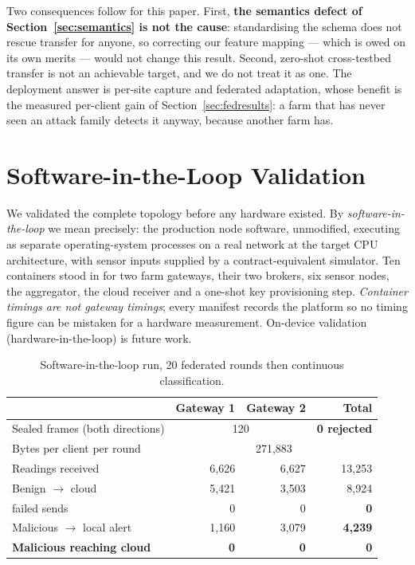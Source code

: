 \documentclass[conference]{IEEEtran}
\begin{document}
Two consequences follow for this paper. First, \textbf{the semantics defect of
Section~\ref{sec:semantics} is not the cause}: standardising the schema does not rescue transfer
for anyone, so correcting our feature mapping --- which is owed on its own merits --- would not
change this result. Second, zero-shot cross-testbed transfer is not an achievable target, and we
do not treat it as one. The deployment answer is per-site capture and federated adaptation, whose
benefit is the measured per-client gain of Section~\ref{sec:fedresults}: a farm that has never
seen an attack family detects it anyway, because another farm has.

\section{Software-in-the-Loop Validation}\label{sec:sil}
We validated the complete topology before any hardware existed. By
\emph{software-in-the-loop} we mean precisely: the production node software, unmodified,
executing as separate operating-system processes on a real network at the target CPU
architecture, with sensor inputs supplied by a contract-equivalent simulator. Ten containers
stood in for two farm gateways, their two brokers, six sensor nodes, the aggregator, the cloud
receiver and a one-shot key provisioning step. \emph{Container timings are not gateway timings};
every manifest records the platform so no timing figure can be mistaken for a hardware
measurement. On-device validation (hardware-in-the-loop) is future work.

\begin{table}[tbp]
\caption{Software-in-the-loop run, 20 federated rounds then continuous classification.}
\label{tab:sil}
\centering\footnotesize\setlength{\tabcolsep}{4pt}
\begin{tabular}{@{}p{3.6cm}rrr@{}}
\toprule
 & Gateway 1 & Gateway 2 & Total\\
\midrule
Sealed frames (both directions) & \multicolumn{2}{c}{120} & \textbf{0 rejected}\\
Bytes per client per round      & \multicolumn{3}{c}{271{,}883}\\
\midrule
Readings received        & 6{,}626 & 6{,}627 & 13{,}253\\
Benign $\rightarrow$ cloud & 5{,}421 & 3{,}503 & 8{,}924\\
\quad failed sends         & 0 & 0 & \textbf{0}\\
Malicious $\rightarrow$ local alert & 1{,}160 & 3{,}079 & \textbf{4{,}239}\\
\textbf{Malicious reaching cloud}   & \textbf{0} & \textbf{0} & \textbf{0}\\
\bottomrule
\end{tabular}
\end{table}
\end{document}
